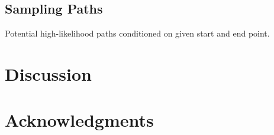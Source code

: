 \documentclass{edm_template}
\begin{document}
\subsection{Sampling Paths}

Potential high-likelihood paths conditioned on given start and end point. 

\section{Discussion}


\section{Acknowledgments}

%

%
%
\end{document}
